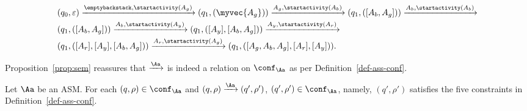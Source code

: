 {\begin{example}
%
\[
\begin{array}{l}
\smallskip
(q_0, \varepsilon) \xrightarrow{\emptybackstack, \startactivity(A_g)} (q_1, (\myvec{A_g}))
\xrightarrow{A_g, \startactivity(A_b)} (q_1, ([A_b,A_g] ))   \xrightarrow{A_b,  \startactivity(A_b)}  \\
\smallskip
(q_1, ([A_b,A_g]))  \xrightarrow{A_b, \startactivity(A_y)}  (q_1, ( [A_y], [A_b, A_g])) \xrightarrow{A_y, \startactivity(A_r)}  \\
 (q_1, ([A_r], [A_y], [A_b, A_g]))  \xrightarrow{A_r, \startactivity(A_g)} (q_1, ([A_g,A_b,A_g], [A_r], [A_y])).
\end{array}
\]
\end{example}

%
Proposition~\ref{prop:sem} reassures that $\xrightarrow{\Aa}$ is indeed a relation on $\conf_\Aa$ as per Definition~\ref{def-ass-conf}.

\begin{proposition} \label{prop:sem}
Let $\Aa$ be an ASM. For each $(q, \rho) \in \conf_\Aa$ and  $(q, \rho) \xrightarrow{\Aa} (q', \rho')$,
$(q', \rho') \in \conf_\Aa$, namely, $(q', \rho')$  satisfies the five constraints in Definition~\ref{def-ass-conf}.
\end{proposition}


}
